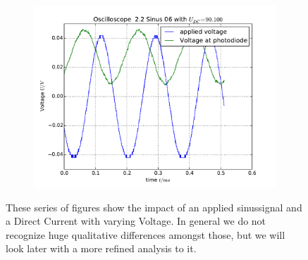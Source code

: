 \begin{figure}
\begin{subfigure}[b]{\picwidth}
        \caption{}
    \end{subfigure}
    \begin{subfigure}[b]{\picwidth}
        \includegraphics[width=\textwidth]{analysis/figures/22sinus06}
        \caption{}
    \end{subfigure}

    \caption{These series of figures show the impact of
        an applied sinussignal and a Direct Current with
        varying Voltage. In general we do not recognize huge 
        qualitative differences amongst those, but we will look
        later with a more refined analysis to it.}
    \label{fig:sinus1}
\end{figure}
\flushleft
